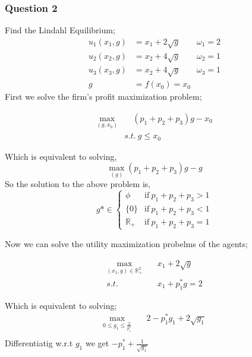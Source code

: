 \documentclass[12pt,a4paper,fleqn]{article}
\begin{document}
\subsubsection{Question 2}
Find the Lindahl Equilibrium;
  \begin{align*}
     u_{1}(x_{1},g)&= x_{1}+2\sqrt{g} \qquad \omega_{1}=2\\
     u_{2}(x_{2},g)&= x_{2}+4\sqrt{g} \qquad \omega_{2}=1\\
     u_{3}(x_{3},g)&= x_{2}+4\sqrt{g} \qquad \omega_{3}=1\\
     g&=f(x_{0})=x_{0}
\end{align*}
First we solve the firm's profit maximization problem;
\begin{tcolorbox}
    \begin{align*}
        \max_{(g,x_{0})} & \quad (p_{1}+p_{2}+p_{3})g-x_{0} \\
        &s.t. \ g \leq x_{0}
 \end{align*}
\end{tcolorbox}
Which is equivalent to solving,
     \begin{equation*}
           \max_{(g)} (p_{1}+p_{2}+p_{3})g-g
    \end{equation*}
 So the solution to the above problem is,
    \begin{equation*}
        g* \in \begin{cases} \phi & \text{if} \ p_{1}+p_{2}+p_{3} > 1\\
            \{0\} & \text{if} \ p_{1}+p_{2}+p_{3} <1\\
            \mathbb{R}_{+} & \text{if} \ p_{1}+p_{2}+p_{3}=1
        \end{cases}
    \end{equation*}    

Now we can solve the utility maximization probelms of the agents;
\begin{tcolorbox}
     \begin{align*}
           \max_{(x_{1},g)\in \mathbb{R}^{2}_{+}} & \quad x_{1} + 2\sqrt{g} \\
           s.t. & \quad x_{1} + p_{1}^* g =2
    \end{align*}
\end{tcolorbox}
Which is equivalent to solving;
\begin{align*}
       \max_{0 \leq g_{1} \leq \frac{2}{p_{1}^*}} & \quad 2-p_{1}^*g_{1} + 2\sqrt{g_{1}} \\
\end{align*}
Differentiatig w.r.t \(g_{1}\)  we get \(-p_{1}^* + \frac{1}{\sqrt{g_{1}}}\)  
\end{document}
